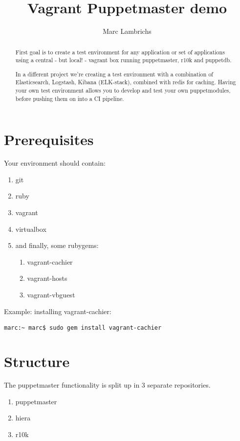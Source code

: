 \documentclass{article}
\begin{document}
\title{Vagrant Puppetmaster demo}
\author{Marc Lambrichs}

\maketitle

\begin{abstract}
First goal is to create a test environment for any application or set of applications using a central - but local! - vagrant box running puppetmaster, r10k and puppetdb.

In a different project we're creating a test environment with a combination of Elasticsearch, Logstash, Kibana (ELK-stack), combined with redis for caching. Having your own test environment allows you to develop and test your own puppetmodules, before pushing them on into a CI pipeline.
\end{abstract}

\section{Prerequisites}
Your environment should contain:
\begin{enumerate}
\item git
\item ruby
\item vagrant
\item virtualbox
\item and finally, some rubygems:
\begin{enumerate}
\item vagrant-cachier
\item vagrant-hosts
\item vagrant-vbguest
\end{enumerate}
\end{enumerate}
Example: installing vagrant-cachier:

\begin{verbatim}
marc:~ marc$ sudo gem install vagrant-cachier
\end{verbatim}

\section{Structure}
The puppetmaster functionality is split up in 3 separate repositories.
\begin{enumerate}
\item puppetmaster
\item hiera
\item r10k
\end{enumerate}
\end{document}
